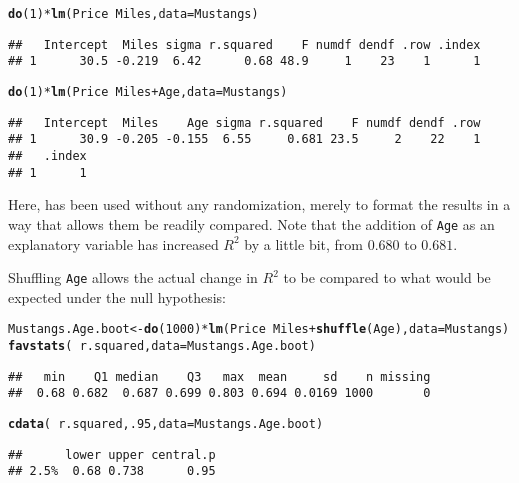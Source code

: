 \documentclass[11pt]{article}\usepackage[]{graphicx}\usepackage[]{color}
\makeatletter
\newcommand{\hlnum}[1]{\textcolor[rgb]{0.686,0.059,0.569}{#1}}%
\newcommand{\hlopt}[1]{\textcolor[rgb]{0,0,0}{#1}}%
\newcommand{\hlstd}[1]{\textcolor[rgb]{0.345,0.345,0.345}{#1}}%
\newcommand{\hlkwb}[1]{\textcolor[rgb]{0.69,0.353,0.396}{#1}}%
\newcommand{\hlkwc}[1]{\textcolor[rgb]{0.333,0.667,0.333}{#1}}%
\newcommand{\hlkwd}[1]{\textcolor[rgb]{0.737,0.353,0.396}{\textbf{#1}}}%
\newenvironment{kframe}{%
 \def\at@end@of@kframe{}%
 \ifinner\ifhmode%
  \def\at@end@of@kframe{\end{minipage}}%
  \begin{minipage}{\columnwidth}%
 \fi\fi%
 \def\FrameCommand##1{\hskip\@totalleftmargin \hskip-\fboxsep
 \colorbox{shadecolor}{##1}\hskip-\fboxsep
     \hskip-\linewidth \hskip-\@totalleftmargin \hskip\columnwidth}%
 \MakeFramed {\advance\hsize-\width
   \@totalleftmargin\z@ \linewidth\hsize
   \@setminipage}}%
 {\par\unskip\endMakeFramed%
 \at@end@of@kframe}
\newenvironment{knitrout}{}{} %
\makeatother
\begin{document}
\begin{knitrout}
\color{fgcolor}\begin{kframe}
\begin{alltt}
\hlkwd{do}\hlstd{(}\hlnum{1}\hlstd{)} \hlopt{*} \hlkwd{lm}\hlstd{(Price} \hlopt{~} \hlstd{Miles,} \hlkwc{data} \hlstd{= Mustangs)}
\end{alltt}
\begin{verbatim}
##   Intercept  Miles sigma r.squared    F numdf dendf .row .index
## 1      30.5 -0.219  6.42      0.68 48.9     1    23    1      1
\end{verbatim}
\begin{alltt}
\hlkwd{do}\hlstd{(}\hlnum{1}\hlstd{)} \hlopt{*} \hlkwd{lm}\hlstd{(Price} \hlopt{~} \hlstd{Miles} \hlopt{+} \hlstd{Age,} \hlkwc{data} \hlstd{= Mustangs)}
\end{alltt}
\begin{verbatim}
##   Intercept  Miles    Age sigma r.squared    F numdf dendf .row
## 1      30.9 -0.205 -0.155  6.55     0.681 23.5     2    22    1
##   .index
## 1      1
\end{verbatim}
\end{kframe}
\end{knitrout}

Here,  has been used without any randomization, merely to format the results in a way that allows them be readily compared.  Note that the addition of \texttt{Age} as an explanatory variable has increased $R^2$ by a little bit, from $0.680$ to $0.681$.  

Shuffling \texttt{Age} allows the actual change in $R^2$ to be compared to what would be expected under the null hypothesis:
\begin{knitrout}
\color{fgcolor}\begin{kframe}
\begin{alltt}
\hlstd{Mustangs.Age.boot} \hlkwb{<-} \hlkwd{do}\hlstd{(}\hlnum{1000}\hlstd{)} \hlopt{*} \hlkwd{lm}\hlstd{(Price} \hlopt{~} \hlstd{Miles} \hlopt{+} \hlkwd{shuffle}\hlstd{(Age),} \hlkwc{data} \hlstd{= Mustangs )}
\hlkwd{favstats}\hlstd{(}\hlopt{~} \hlstd{r.squared,} \hlkwc{data} \hlstd{= Mustangs.Age.boot)}
\end{alltt}
\begin{verbatim}
##   min    Q1 median    Q3   max  mean     sd    n missing
##  0.68 0.682  0.687 0.699 0.803 0.694 0.0169 1000       0
\end{verbatim}
\begin{alltt}
\hlkwd{cdata}\hlstd{(}\hlopt{~} \hlstd{r.squared,} \hlnum{.95}\hlstd{,} \hlkwc{data} \hlstd{= Mustangs.Age.boot)}
\end{alltt}
\begin{verbatim}
##      lower upper central.p
## 2.5%  0.68 0.738      0.95
\end{verbatim}
\end{kframe}
\end{knitrout}
\end{document}
